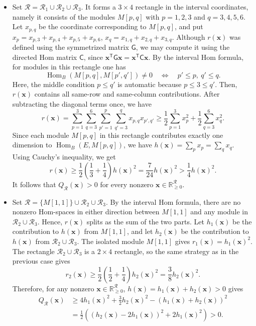 \documentclass[a4,12pt]{amsart}
\numberwithin{equation}{section} %
\def\Hom{\operatorname{Hom}} %
\theoremstyle{definition} %
\begin{document}
\begin{itemize}
\item Set $\mathcal{R}=\mathcal{R}_1\cup\mathcal{R}_2\cup\mathcal{R}_3$. 
It forms a $3\times4$ rectangle in the interval coordinates, namely it consists of the modules $M[p,q]$ with $p=1,2,3$ and $q=3,4,5,6$. 
Let $x_{p,q}$ be the coordinate corresponding to $M[p,q]$, and put $x_p=x_{p,3}+x_{p,4}+x_{p,5}+x_{p,6}$, $x_q=x_{1,q}+x_{2,q}+x_{3,q}$. Although $r(\mathbf{x})$ was defined using the symmetrized matrix $\mathsf{G}$, we may compute it using the directed Hom matrix $\mathsf{C}$, since $\mathbf{x}^{\mathsf{T}}\mathsf{G}\mathbf{x}=\mathbf{x}^{\mathsf{T}}\mathsf{C}\mathbf{x}$. By the interval Hom formula, for modules in this rectangle one has
\[
\Hom_B(M[p,q],M[p',q'])\neq0
\quad\Longleftrightarrow\quad
p'\leq p,\ q'\leq q.
\]
Here, the middle condition $p\leq q'$ is automatic because $p\leq3\leq q'$. Then, $r(\mathbf{x})$ contains all same-row and same-column contributions. After subtracting the diagonal terms once, we have 
\[
r(\mathbf{x}) =
\sum_{p=1}^3\sum_{q=3}^6
\sum_{p'=1}^{p}\sum_{q'=3}^{q}
x_{p,q}x_{p',q'}
\geq
\frac12\sum_{p=1}^3 x_p^2
+
\frac12\sum_{q=3}^6 x_q^2.
\]
Since each module $M[p,q]$ in this rectangle contributes exactly one dimension to $\Hom_B(E,M[p,q])$, we have $h(\mathbf{x})=\sum_p x_p=\sum_q x_q$. Using Cauchy's inequality, we get
\[
r(\mathbf{x})
\geq
\frac12\left(\frac13+\frac14\right)h(\mathbf{x})^2
=
\frac7{24}h(\mathbf{x})^2
>
\frac14h(\mathbf{x})^2.
\]
It follows that $Q_{\mathcal{R}}(\mathbf{x})>0$ for every nonzero $\mathbf{x}\in\mathbb{R}_{\geq 0}^{\mathcal{R}}$.

\item Set $\mathcal{R}=\{M[1,1]\}\cup\mathcal{R}_2\cup\mathcal{R}_3$. By the interval Hom formula, there are no nonzero Hom-spaces in either direction between $M[1,1]$ and any module in $\mathcal{R}_2\cup\mathcal{R}_3$. Hence, $r(\mathbf{x})$ splits as the sum of the two parts. Let $h_1(\mathbf{x})$ be the contribution to $h(\mathbf{x})$ from $M[1,1]$, and let $h_2(\mathbf{x})$ be the contribution to $h(\mathbf{x})$ from $\mathcal{R}_2\cup\mathcal{R}_3$. The isolated module $M[1,1]$ gives $r_1(\mathbf{x})=h_1(\mathbf{x})^2$. The rectangle $\mathcal{R}_2\cup\mathcal{R}_3$ is a $2\times4$ rectangle, so the same strategy as in the previous case gives
\[
r_2(\mathbf{x})\geq
\frac12\left(\frac12+\frac14\right)h_2(\mathbf{x})^2
=
\frac38h_2(\mathbf{x})^2.
\]
Therefore, for any nonzero $\mathbf{x}\in\mathbb{R}_{\geq 0}^{\mathcal{R}}$, $h(\mathbf{x})=h_1(\mathbf{x})+h_2(\mathbf{x})>0$ gives 
\[
\begin{aligned}
Q_{\mathcal{R}}(\mathbf{x})
&\geq
4h_1(\mathbf{x})^2+\frac32h_2(\mathbf{x})^2-(h_1(\mathbf{x})+h_2(\mathbf{x}))^2\\
&=
\frac12\left((h_2(\mathbf{x})-2h_1(\mathbf{x}))^2+2h_1(\mathbf{x})^2\right)>0.
\end{aligned}
\]


\end{itemize}
\end{document}

